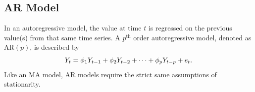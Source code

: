 \documentclass[12pt, centerh1]{article}
\begin{document}
\subsection{AR Model}
In an autoregressive model, the value at time $t$ is regressed on the previous value(s) from that same time series. A $p^{\text{th}}$ order autoregressive model, denoted as AR$(p)$, is described by
\begin{equation}\label{eq:AR}
    \centering
    Y_t = \phi_1Y_{t-1} + \phi_2Y_{t-2} + \cdots + \phi_pY_{t-p} + e_t.
\end{equation} 
Like an MA model, AR models require the strict same assumptions of stationarity.
\end{document}
